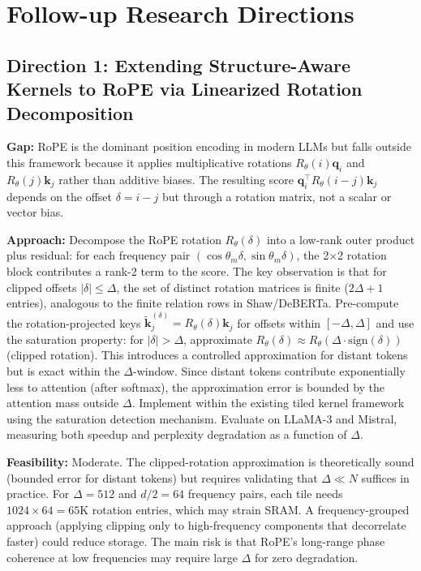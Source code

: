 \documentclass[11pt,a4paper]{article}
\begin{document}
\section{Follow-up Research Directions}

\subsection{Direction 1: Extending Structure-Aware Kernels to RoPE via Linearized Rotation Decomposition}
\textbf{Gap:} RoPE is the dominant position encoding in modern LLMs but falls outside this framework because it applies multiplicative rotations $R_\theta(i) \mathbf{q}_i$ and $R_\theta(j) \mathbf{k}_j$ rather than additive biases. The resulting score $\mathbf{q}_i^\top R_\theta(i{-}j) \mathbf{k}_j$ depends on the offset $\delta = i{-}j$ but through a rotation matrix, not a scalar or vector bias.

\textbf{Approach:} Decompose the RoPE rotation $R_\theta(\delta)$ into a low-rank outer product plus residual: for each frequency pair $(\cos\theta_m\delta, \sin\theta_m\delta)$, the 2$\times$2 rotation block contributes a rank-2 term to the score. The key observation is that for clipped offsets $|\delta| \leq \Delta$, the set of distinct rotation matrices is finite ($2\Delta{+}1$ entries), analogous to the finite relation rows in Shaw/DeBERTa. Pre-compute the rotation-projected keys $\tilde{\mathbf{k}}_j^{(\delta)} = R_\theta(\delta)\mathbf{k}_j$ for offsets within $[-\Delta, \Delta]$ and use the saturation property: for $|\delta| > \Delta$, approximate $R_\theta(\delta) \approx R_\theta(\Delta \cdot \mathrm{sign}(\delta))$ (clipped rotation). This introduces a controlled approximation for distant tokens but is exact within the $\Delta$-window. Since distant tokens contribute exponentially less to attention (after softmax), the approximation error is bounded by the attention mass outside $\Delta$. Implement within the existing tiled kernel framework using the saturation detection mechanism. Evaluate on LLaMA-3 and Mistral, measuring both speedup and perplexity degradation as a function of $\Delta$.

\textbf{Feasibility:} Moderate. The clipped-rotation approximation is theoretically sound (bounded error for distant tokens) but requires validating that $\Delta \ll N$ suffices in practice. For $\Delta{=}512$ and $d/2{=}64$ frequency pairs, each tile needs $1024 \times 64 = 65$K rotation entries, which may strain SRAM. A frequency-grouped approach (applying clipping only to high-frequency components that decorrelate faster) could reduce storage. The main risk is that RoPE's long-range phase coherence at low frequencies may require large $\Delta$ for zero degradation.
\end{document}
